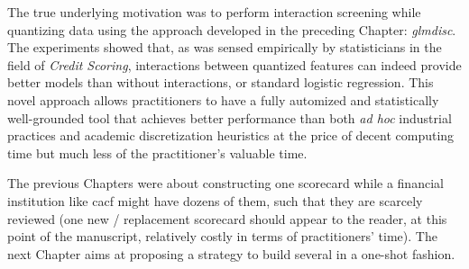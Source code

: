 The true underlying motivation was to perform interaction screening while quantizing data using the approach developed in the preceding Chapter: \textit{glmdisc}.
The experiments showed that, as was sensed empirically by statisticians in the field of \textit{Credit Scoring}, interactions between quantized features can indeed provide better models than without interactions, or standard logistic regression. This novel approach allows practitioners to have a fully automized and statistically well-grounded tool that achieves better performance than both \textit{ad hoc} industrial practices and academic discretization heuristics at the price of decent computing time but much less of the practitioner's valuable time.


The previous Chapters were about constructing one scorecard while a financial institution like \gls{cacf} might have dozens of them, such that they are scarcely reviewed (one new / replacement scorecard should appear to the reader, at this point of the manuscript, relatively costly in terms of practitioners' time). The next Chapter aims at proposing a strategy to build several in a one-shot fashion.












\printbibliography[heading=subbibliography, title=References of Chapter 4]
